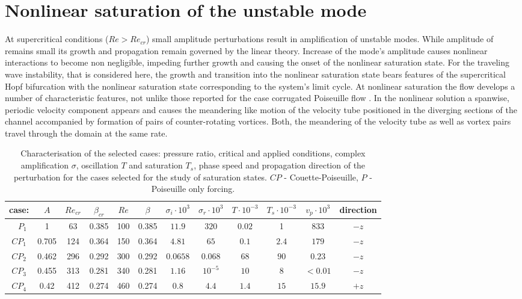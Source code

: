 \documentclass[lineno]{jfm}
\begin{document}
\section{Nonlinear saturation of the unstable mode}
\label{sec:nonlinear_saturation}
At supercritical conditions ($Re>Re_{cr}$) small amplitude perturbations result in amplification of unstable modes.
While amplitude of   remains small its growth and propagation remain governed by the linear theory.
Increase of the mode's amplitude causes nonlinear interactions to become non negligible,
impeding further growth and causing the onset of the nonlinear saturation state.
For the traveling wave instability, that is considered here, the growth and transition into the nonlinear saturation state bears features of the supercritical Hopf bifurcation \citep{Nikesh2018} with the nonlinear saturation state corresponding to the system's limit cycle.
At nonlinear saturation the flow develops a number of characteristic features,
not unlike those reported for the case corrugated Poiseuille flow \citep{Nikesh2017}.
In the nonlinear solution a spanwise, periodic velocity component appears and causes the meandering like motion of the velocity tube positioned in the diverging sections of the channel accompanied by formation of pairs of counter-rotating vortices.
Both, the meandering of the velocity tube as well as vortex pairs travel through the domain at the same rate.

\begin{table}
    \centering
    \begin{tabular}{|c||c|cc||cc|cc|cc|cc|}
     \hline
    case:  & $A$ & $Re_{cr}$ & $\beta_{cr}$ & $Re$ & $\beta$ & $\sigma_i\cdot10^{3}$ & $\sigma_r\cdot10^{3}$ & $T\cdot10^{-3}$ & $T_s\cdot10^{-3}$ & $v_p\cdot10^{3}$ & direction\\ \hline
 \hline
    ~ $P_1$   & 1 & 63 & 0.385 & 100 & 0.385 & $11.9$ & $320$ & $0.02$ &1 & $833$ & $-z$ \\ 
           \hline
    $CP_1$  & 0.705 & 124 & 0.364  & 150  & 0.364 & $4.81$ & $65$  & $0.1$ & $2.4$ & $179$ & $-z$\\
    $CP_2$   & 0.462 & 296 & 0.292& 300 & 0.292 & $0.0658$ & $0.068$ &$68$ &$90$ & $0.23$ & $-z$\\
    $CP_3$   & 0.455 & 313 & 0.281 & 340 & 0.281 & $1.16$ &$10^{-5}$ & $10$ & $8$ & $<0.01$ & $-z$ \\
    $CP_4$   & 0.42 & 412 & 0.274 & 460 & 0.274 & $0.8$ & $4.4$ & $1.4$ & $15$ & $15.9$ & $+z$ \\
 \hline
    \end{tabular}
    \caption{Characterisation of the selected cases: pressure ratio, critical and applied conditions, complex amplification $\sigma$, oscillation  $T$ and  saturation $T_s$, phase speed and propagation direction of the perturbation for the cases selected for the study of saturation states. $CP$ - Couette-Poiseuille, $P$ - Poiseuille only forcing.}
    \label{tab:cases}
\end{table}
\end{document}

